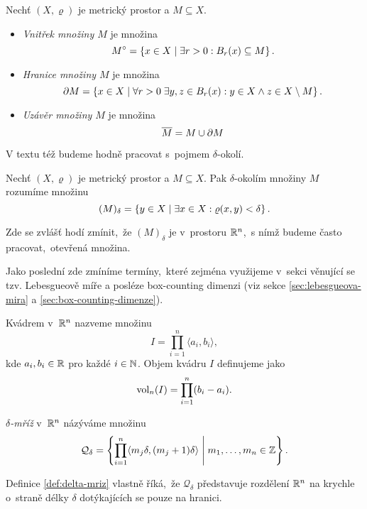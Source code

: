 \begin{definition}\label{def:vnitrek-hranice-uzaver}
    Nechť $(X,\varrho)$ je metrický prostor a $M\subseteq X$.
    \begin{itemize}
        \item \emph{Vnitřek množiny $M$} je množina
        \[M^\circ=\left\{x\in X\mid \exists r>0: B_r(x)\subseteq M\right\}.\]
        \item \emph{Hranice množiny $M$} je množina
        \[\partial M=\left\{x\in X\mid \forall r>0\;\exists y,z\in B_r(x): y\in X\land z\in X\setminus M\right\}.\]
        \item \emph{Uzávěr množiny $M$} je množina
        \[\overline{M}=M\cup\partial M\]
    \end{itemize}
\end{definition}
V textu též budeme hodně pracovat s~pojmem $\delta$-okolí.
\begin{definition}\label{def:delta-okoli}
    Nechť $(X,\varrho)$ je metrický prostor a $M\subseteq X$. Pak $\delta$-okolím množiny $M$ rozumíme množinu
    \[(M)_\delta=\left\{y\in X\mid \exists x\in X: \varrho(x,y)<\delta\right\}.\]
\end{definition}
Zde se zvlášť hodí zmínit,~že $(M)_\delta$ je v~prostoru $\mathbb{R}^n$,~s nímž budeme často pracovat,~otevřená množina.

Jako poslední zde zmíníme termíny,~které zejména využijeme v~sekci věnující se tzv. Lebesgueově míře a posléze box-counting dimenzi (viz sekce \ref{sec:lebesgueova-mira} a \ref{sec:box-counting-dimenze}).
\begin{definition}[Kvádr]\label{def:kvadr}
    Kvádrem v~$\mathbb{R}^n$ nazveme množinu
    \[I=\prod_{i=1}^{n}\langle a_i,b_i\rangle,\]
    kde $a_i,b_i\in\mathbb{R}$ pro každé $i\in\mathbb{N}$. Objem kvádru $I$ definujeme jako
    \[\operatorname{vol}_n(I)=\prod_{i=1}^{n}(b_i-a_i).\]
\end{definition}
\begin{definition}\label{def:delta-mriz}
    \emph{$\delta$-mříž} v~$\mathbb{R}^n$ názýváme množinu
    \[\mathcal{Q}_\delta=\left\{\prod_{i=1}^{n}\langle m_j\delta,(m_j+1)\delta\rangle\;\middle|\;m_1,\ldots,m_n\in\mathbb{Z}\right\}.\]
\end{definition}
Definice \ref{def:delta-mriz} vlastně říká,~že $\mathcal{Q}_\delta$ představuje rozdělení $\mathbb{R}^n$ na krychle o~straně délky $\delta$ dotýkajících se pouze na hranici.

